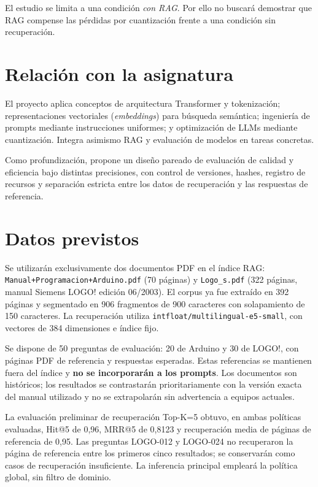 \documentclass[11pt,a4paper]{article}
\begin{document}
El estudio se limita a una condición \emph{con RAG}. Por ello no buscará demostrar que RAG compense las pérdidas por cuantización frente a una condición sin recuperación.

\section{Relación con la asignatura}
El proyecto aplica conceptos de arquitectura Transformer y tokenización; representaciones vectoriales (\emph{embeddings}) para búsqueda semántica; ingeniería de prompts mediante instrucciones uniformes; y optimización de LLMs mediante cuantización. Integra asimismo RAG y evaluación de modelos en tareas concretas.

Como profundización, propone un diseño pareado de evaluación de calidad y eficiencia bajo distintas precisiones, con control de versiones, hashes, registro de recursos y separación estricta entre los datos de recuperación y las respuestas de referencia.

\section{Datos previstos}
Se utilizarán exclusivamente dos documentos PDF en el índice RAG: \texttt{Manual+Programacion+Arduino.pdf} (70 páginas) y \texttt{Logo\_s.pdf} (322 páginas, manual Siemens LOGO! edición 06/2003). El corpus ya fue extraído en 392 páginas y segmentado en 906 fragmentos de 900 caracteres con solapamiento de 150 caracteres. La recuperación utiliza \texttt{intfloat/multilingual-e5-small}, con vectores de 384 dimensiones e índice fijo.

Se dispone de 50 preguntas de evaluación: 20 de Arduino y 30 de LOGO!, con páginas PDF de referencia y respuestas esperadas. Estas referencias se mantienen fuera del índice y \textbf{no se incorporarán a los prompts}. Los documentos son históricos; los resultados se contrastarán prioritariamente con la versión exacta del manual utilizado y no se extrapolarán sin advertencia a equipos actuales.

La evaluación preliminar de recuperación Top-K=5 obtuvo, en ambas políticas evaluadas, Hit@5 de 0,96, MRR@5 de 0,8123 y recuperación media de páginas de referencia de 0,95. Las preguntas LOGO-012 y LOGO-024 no recuperaron la página de referencia entre los primeros cinco resultados; se conservarán como casos de recuperación insuficiente. La inferencia principal empleará la política global, sin filtro de dominio.
\end{document}
